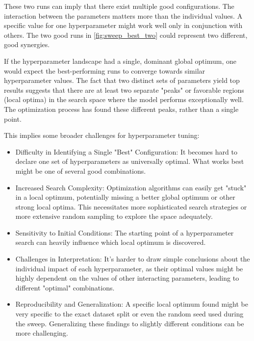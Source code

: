 These two runs can imply that there exist multiple good configurations. The interaction between the parameters matters more than the individual values. A specific value for one hyperparameter might work well only in conjunction with others. The two good runs in \autoref{fig:sweep_best_two} could represent two different, good synergies. 


If the hyperparameter landscape had a single, dominant global optimum, one would expect the best-performing runs to converge towards similar hyperparameter values. The fact that two distinct sets of parameters yield top results suggests that there are at least two separate "peaks" or favorable regions (local optima) in the search space where the model performs exceptionally well. The optimization process has found these different peaks, rather than a single point.

This implies some broader challenges for hyperparameter tuning:

\begin{itemize}
    \item Difficulty in Identifying a Single "Best" Configuration: It becomes hard to declare one set of hyperparameters as universally optimal. What works best might be one of several good combinations.
    \item Increased Search Complexity: Optimization algorithms can easily get "stuck" in a local optimum, potentially missing a better global optimum or other strong local optima. This necessitates more sophisticated search strategies or more extensive random sampling to explore the space adequately.
    \item Sensitivity to Initial Conditions: The starting point of a hyperparameter search can heavily influence which local optimum is discovered.
    \item Challenges in Interpretation: It's harder to draw simple conclusions about the individual impact of each hyperparameter, as their optimal values might be highly dependent on the values of other interacting parameters, leading to different "optimal" combinations.
    \item Reproducibility and Generalization: A specific local optimum found might be very specific to the exact dataset split or even the random seed used during the sweep. Generalizing these findings to slightly different conditions can be more challenging.
\end{itemize}



